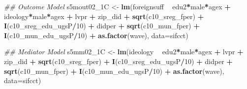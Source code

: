 \documentclass[
]{article}
\newenvironment{Shaded}{\begin{snugshade}}{\end{snugshade}}
\newcommand{\CommentTok}[1]{\textcolor[rgb]{0.56,0.35,0.01}{\textit{#1}}}
\newcommand{\DataTypeTok}[1]{\textcolor[rgb]{0.13,0.29,0.53}{#1}}
\newcommand{\DecValTok}[1]{\textcolor[rgb]{0.00,0.00,0.81}{#1}}
\newcommand{\KeywordTok}[1]{\textcolor[rgb]{0.13,0.29,0.53}{\textbf{#1}}}
\newcommand{\NormalTok}[1]{#1}
\newcommand{\OperatorTok}[1]{\textcolor[rgb]{0.81,0.36,0.00}{\textbf{#1}}}
\newcommand{\StringTok}[1]{\textcolor[rgb]{0.31,0.60,0.02}{#1}}
\begin{document}
\begin{Shaded}
\begin{Highlighting}[]
\CommentTok{## Outcome Model }
\NormalTok{s5mout02_1C <-}\StringTok{ }\KeywordTok{lm}\NormalTok{(foreignsuff  }\OperatorTok{~}\StringTok{ }\NormalTok{edu2}\OperatorTok{*}\NormalTok{male}\OperatorTok{*}\NormalTok{agex }\OperatorTok{+}\StringTok{ }\NormalTok{ideology}\OperatorTok{*}\NormalTok{male}\OperatorTok{*}\NormalTok{agex }\OperatorTok{+}\StringTok{ }\NormalTok{lvpr }\OperatorTok{+}\StringTok{  }
\StringTok{                    }\NormalTok{zip_did }\OperatorTok{+}\StringTok{ }\KeywordTok{sqrt}\NormalTok{(c10_sreg_fper) }\OperatorTok{+}\StringTok{ }\KeywordTok{I}\NormalTok{(c10_sreg_edu_ugsP}\OperatorTok{/}\DecValTok{10}\NormalTok{) }\OperatorTok{+}\StringTok{ }
\StringTok{                    }\NormalTok{didper }\OperatorTok{+}\StringTok{ }\KeywordTok{sqrt}\NormalTok{(c10_mun_fper) }\OperatorTok{+}\StringTok{ }\KeywordTok{I}\NormalTok{(c10_mun_edu_ugsP}\OperatorTok{/}\DecValTok{10}\NormalTok{) }\OperatorTok{+}\StringTok{ }
\StringTok{                    }\KeywordTok{as.factor}\NormalTok{(wave), }\DataTypeTok{data=}\NormalTok{sifcct)}

\CommentTok{## Mediator Model}
\NormalTok{s5mm02_1C <-}\StringTok{ }\KeywordTok{lm}\NormalTok{(ideology  }\OperatorTok{~}\StringTok{ }\NormalTok{edu2}\OperatorTok{*}\NormalTok{male}\OperatorTok{*}\NormalTok{agex }\OperatorTok{+}\StringTok{ }\NormalTok{lvpr }\OperatorTok{+}\StringTok{  }
\StringTok{                  }\NormalTok{zip_did }\OperatorTok{+}\StringTok{ }\KeywordTok{sqrt}\NormalTok{(c10_sreg_fper) }\OperatorTok{+}\StringTok{ }\KeywordTok{I}\NormalTok{(c10_sreg_edu_ugsP}\OperatorTok{/}\DecValTok{10}\NormalTok{) }\OperatorTok{+}\StringTok{ }
\StringTok{                  }\NormalTok{didper }\OperatorTok{+}\StringTok{ }\KeywordTok{sqrt}\NormalTok{(c10_mun_fper) }\OperatorTok{+}\StringTok{ }\KeywordTok{I}\NormalTok{(c10_mun_edu_ugsP}\OperatorTok{/}\DecValTok{10}\NormalTok{) }\OperatorTok{+}\StringTok{ }
\StringTok{                  }\KeywordTok{as.factor}\NormalTok{(wave), }\DataTypeTok{data=}\NormalTok{sifcct)}


\end{Highlighting}
\end{Shaded}
\end{document}
